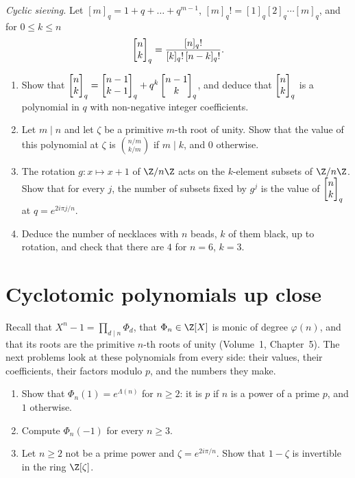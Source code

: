 \begin{exercise}[$\star\star\star$]\label{pb:sieving}
\emph{Cyclic sieving.} Let $[m]_q=1+q+\dots+q^{m-1}$, $[m]_q!=[1]_q[2]_q\cdots[m]_q$, and for $0\le k\le n$
\[
\begin{bmatrix}n\\k\end{bmatrix}_q=\frac{[n]_q!}{[k]_q!\,[n-k]_q!}.
\]
\begin{enumerate}[label=(\alph*)]
\item Show that $\begin{bmatrix}n\\k\end{bmatrix}_q=\begin{bmatrix}n-1\\k-1\end{bmatrix}_q+q^k\begin{bmatrix}n-1\\k\end{bmatrix}_q$, and deduce that $\begin{bmatrix}n\\k\end{bmatrix}_q$ is a polynomial in $q$ with
non-negative integer coefficients.
\item Let $m\mid n$ and let $\zeta$ be a primitive $m$-th root of unity. Show that the value of this polynomial at $\zeta$
is $\binom{n/m}{k/m}$ if $m\mid k$, and $0$ otherwise.
\item The rotation $g:x\mapsto x+1$ of $\Z/n\Z$ acts on the $k$-element subsets of $\Z/n\Z$. Show that for every $j$, the
number of subsets fixed by $g^j$ is the value of $\begin{bmatrix}n\\k\end{bmatrix}_q$ at $q=e^{2i\pi j/n}$.
\item Deduce the number of necklaces with $n$ beads, $k$ of them black, up to rotation, and check that there are $4$ for
$n=6$, $k=3$.
\end{enumerate}
\end{exercise}

\section{Cyclotomic polynomials up close}

Recall that $X^n-1=\prod_{d\mid n}\Phi_d$, that $\Phi_n\in\Z[X]$ is monic of degree $\varphi(n)$, and that its roots are the
primitive $n$-th roots of unity (Volume~1, Chapter~5). The next problems look at these polynomials from every side: their
values, their coefficients, their factors modulo $p$, and the numbers they make.

\begin{exercise}[$\star\star$]\label{pb:phipm1}
\begin{enumerate}[label=(\alph*)]
\item Show that $\Phi_n(1)=e^{\Lambda(n)}$ for $n\ge2$: it is $p$ if $n$ is a power of a prime $p$, and $1$ otherwise.
\item Compute $\Phi_n(-1)$ for every $n\ge3$.
\item Let $n\ge2$ not be a prime power and $\zeta=e^{2i\pi/n}$. Show that $1-\zeta$ is invertible in the ring $\Z[\zeta]$.
\end{enumerate}
\end{exercise}

